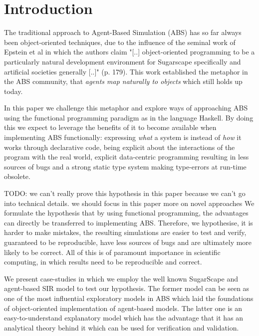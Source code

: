 \section{Introduction}
The traditional approach to Agent-Based Simulation (ABS) has so far always been object-oriented techniques, due to the influence of the seminal work of Epstein et al \cite{epstein_growing_1996} in which the authors claim "[..] object-oriented programming to be a particularly natural development environment for Sugarscape specifically and artificial societies generally [..]" (p. 179). This work established the metaphor in the ABS community, that \textit{agents map naturally to objects} \citep{north_managing_2007} which still holds up today.

In this paper we challenge this metaphor and explore ways of approaching ABS using the functional programming paradigm as in the language Haskell. By doing this we expect to leverage the benefits of it \citep{hudak_history_2007} to become available when implementing ABS functionally: expressing \textit{what} a system is instead of \textit{how} it works through declarative code, being explicit about the interactions of the program with the real world, explicit data-centric programming resulting in less sources of bugs and a strong static type system making type-errors at run-time obsolete. 

TODO: we can't really prove this hypothesis in this paper because we can't go into technical details. we should focus in this paper more on novel approaches 
We formulate the hypothesis that by using functional programming, the advantages can directly be transferred to implementing ABS. Therefore, we hypothesise, it is harder to make mistakes, the resulting simulations are easier to test and verify, guaranteed to be reproducible, have less sources of bugs and are ultimately more likely to be correct. All of this is of paramount importance in scientific computing, in which results need to be reproducible and correct.

We present case-studies in which we employ the well known SugarScape \citep{epstein_growing_1996} and agent-based SIR \citep{macal_agent-based_2010} model to test our hypothesis. The former model can be seen as one of the most influential exploratory models in ABS which laid the foundations of object-oriented implementation of agent-based models. The latter one is an easy-to-understand explanatory model which has the advantage that it has an analytical theory behind it which can be used for verification and validation.

